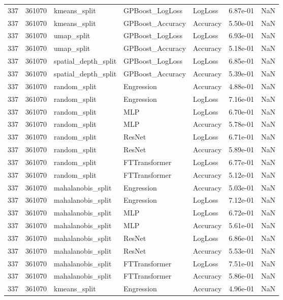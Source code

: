 \begin{tabular}{rrlllrr}
337 & 361070 & kmeans\_split & GPBoost\_LogLoss & LogLoss & 6.87e-01 & NaN \\
337 & 361070 & kmeans\_split & GPBoost\_Accuracy & Accuracy & 5.50e-01 & NaN \\
337 & 361070 & umap\_split & GPBoost\_LogLoss & LogLoss & 6.93e-01 & NaN \\
337 & 361070 & umap\_split & GPBoost\_Accuracy & Accuracy & 5.18e-01 & NaN \\
337 & 361070 & spatial\_depth\_split & GPBoost\_LogLoss & LogLoss & 6.85e-01 & NaN \\
337 & 361070 & spatial\_depth\_split & GPBoost\_Accuracy & Accuracy & 5.39e-01 & NaN \\
337 & 361070 & random\_split & Engression & Accuracy & 4.88e-01 & NaN \\
337 & 361070 & random\_split & Engression & LogLoss & 7.16e-01 & NaN \\
337 & 361070 & random\_split & MLP & LogLoss & 6.70e-01 & NaN \\
337 & 361070 & random\_split & MLP & Accuracy & 5.78e-01 & NaN \\
337 & 361070 & random\_split & ResNet & LogLoss & 6.71e-01 & NaN \\
337 & 361070 & random\_split & ResNet & Accuracy & 5.89e-01 & NaN \\
337 & 361070 & random\_split & FTTransformer & LogLoss & 6.77e-01 & NaN \\
337 & 361070 & random\_split & FTTransformer & Accuracy & 5.12e-01 & NaN \\
337 & 361070 & mahalanobis\_split & Engression & Accuracy & 5.03e-01 & NaN \\
337 & 361070 & mahalanobis\_split & Engression & LogLoss & 7.12e-01 & NaN \\
337 & 361070 & mahalanobis\_split & MLP & LogLoss & 6.72e-01 & NaN \\
337 & 361070 & mahalanobis\_split & MLP & Accuracy & 5.61e-01 & NaN \\
337 & 361070 & mahalanobis\_split & ResNet & LogLoss & 6.86e-01 & NaN \\
337 & 361070 & mahalanobis\_split & ResNet & Accuracy & 5.53e-01 & NaN \\
337 & 361070 & mahalanobis\_split & FTTransformer & LogLoss & 7.51e-01 & NaN \\
337 & 361070 & mahalanobis\_split & FTTransformer & Accuracy & 5.86e-01 & NaN \\
337 & 361070 & kmeans\_split & Engression & Accuracy & 4.96e-01 & NaN \\

\end{tabular}
